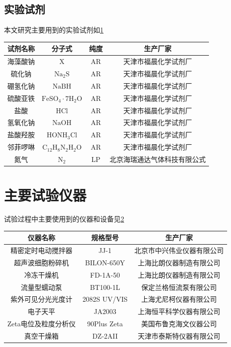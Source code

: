 

\subsection{实验试剂}

本文研究主要用到的实验试剂如\cref{tab1}

\begin{table}[h]
	\centering
	\label{tab1}
	\begin{tabular}{@{}cccc@{}}
        \toprule
		试剂名称&分子式&纯度&生产厂家\\
        \midrule
		海藻酸钠&X&AR&天津市福晨化学试剂厂\\
		硫化钠&$\mathrm{Na_2S}$&AR&天津市福晨化学试剂厂\\
		硼氢化钠&$\mathrm{NaBH}$&AR&天津市福晨化学试剂厂\\
		硫酸亚铁&$\mathrm{FeSO_4\cdot7H_2O}$&AR&天津市福晨化学试剂厂\\
		盐酸&$\mathrm{HCl}$&AR&天津市福晨化学试剂厂\\
        氢氧化钠&$\mathrm{NaOH}$&AR&天津市福晨化学试剂厂\\
        盐酸羟胺&$\mathrm{HONH_3Cl}$&AR&天津市福晨化学试剂厂\\
        邻菲啰啉&$\mathrm{C_12H_8N_2H_2O}$&AR&天津市福晨化学试剂厂\\
        氮气&$\mathrm{N_2}$&LP&北京海瑞通达气体科技有限公式\\
        \bottomrule
	\end{tabular}
\end{table}

\section{主要试验仪器}

试验过程中主要使用到的仪器和设备见\cref{tab2}

\begin{table}[h]
	\centering
	\label{tab2}
	\begin{tabular}{@{}ccc@{}}\toprule
		仪器名称&规格型号&生产厂家\\\midrule
		精密定时电动搅拌器&JJ-1&北京市中兴伟业仪器有限公司\\
        超声波细胞粉碎机&BILON-650Y&上海比朗仪器制造有限公司\\
		冷冻干燥机&FD-1A-50&上海比朗仪器制造有限公司\\
		流量型蠕动泵&BT100-1L&保定兰格恒流泵有限公司\\
		紫外可见分光光度计&2082S UV/VIS&上海尤尼柯仪器有限公司\\
		电子天平&JA2003&上海恒平科学仪器有限公司\\
        Zeta电位及粒度分析仪&90Plus Zeta&美国布鲁克海文仪器公司\\
        真空干燥箱&DZ-2AII&天津市泰斯特仪器有限公司\\\bottomrule
	\end{tabular}
\end{table}

